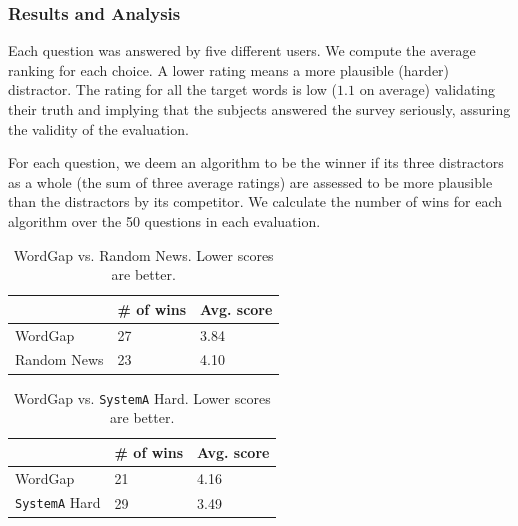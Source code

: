 \subsubsection{Results and Analysis}

Each question was answered by five different users.  We compute the
average ranking for each choice. A lower rating means a more plausible
(harder) distractor.  The rating for all the target words is low
($1.1$ on average) validating their truth and implying that the
subjects answered the survey seriously, assuring the validity of the
evaluation.

For each question, we deem an algorithm to be the winner if its three
distractors as a whole (the sum of three average ratings) are assessed
to be more plausible than the distractors by its competitor. We
calculate the number of wins for each algorithm over the 50 questions
in each evaluation. 



\begin{table}[th]
    \caption{WordGap vs. Random News.  Lower scores are better.}
    \label{table:distractor_1}
    \begin{center}
    \begin{tabular}{| p{2.5cm} | p{1.5cm} | p{1.8cm} |}
        \hline
         & {\bf \# of wins} & {\bf Avg. score}\\
        \hline
        WordGap & 27 & 3.84\\
        \hline
        Random News & 23 & 4.10\\
        \hline
    \end{tabular}
    \end{center}
\end{table}

\begin{table}[th]
    \caption{WordGap vs. {\tt SystemA} Hard.  Lower scores are better.}
    \label{table:distractor_2}
    \begin{center}
    \begin{tabular}{| p{2.5cm} | p{1.5cm} | p{1.8cm} |}
        \hline
         & {\bf \# of wins} & {\bf Avg. score}\\
        \hline
        WordGap & 21 & 4.16\\
        \hline
        {\tt SystemA} Hard & 29 & 3.49\\
        \hline
    \end{tabular}
    \end{center}
\end{table}


